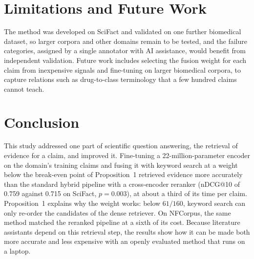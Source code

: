 \section{Limitations and Future Work}
\label{sec:limitations}

The method was developed on SciFact and validated on one further biomedical dataset, so larger
corpora and other domains remain to be tested, and the failure categories, assigned by a single
annotator with AI assistance, would benefit from independent validation. Future work includes
selecting the fusion weight for each claim from inexpensive signals and fine-tuning on larger
biomedical corpora, to capture relations such as drug-to-class terminology that a few hundred
claims cannot teach.

\section{Conclusion}
\label{sec:conclusion}

This study addressed one part of scientific question answering, the retrieval of evidence for a
claim, and improved it. Fine-tuning a 22-million-parameter encoder on the domain's training
claims and fusing it with keyword search at a weight below the break-even point of
Proposition~1 retrieved evidence more accurately than the standard hybrid pipeline with a
cross-encoder reranker (nDCG@10 of 0.759 against 0.715 on SciFact, $p = 0.003$), at about a
third of its time per claim. Proposition~1 explains why the weight works: below $61/160$, keyword
search can only re-order the candidates of the dense retriever. On NFCorpus, the same method
matched the reranked pipeline at a sixth of its cost. Because literature assistants depend on
this retrieval step, the results show how it can be made both more accurate and less expensive
with an openly evaluated method that runs on a laptop.
